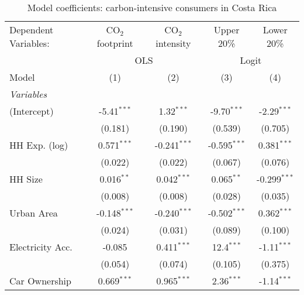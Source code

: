 
\begin{table}[htbp!]
   \centering
   \small
   \begin{adjustbox}{width = 1\textwidth, max height = 0.95\textheight, center}
      \begin{threeparttable}[b]
         \caption{\label{tab:Logit_1_CRI} Model coefficients: carbon-intensive consumers in Costa Rica}
         \begin{tabular}{lcccc}
            \tabularnewline \midrule \midrule
            Dependent Variables: & CO$_{2}$ footprint & CO$_{2}$ intensity & Upper 20\%     & Lower 20\%\\   
             & \multicolumn{2}{c}{OLS} & \multicolumn{2}{c}{Logit} \\ 
            Model                & (1)                & (2)                & (3)            & (4)\\  
            \midrule
            \emph{Variables}\\
            (Intercept)          & -5.41$^{***}$      & 1.32$^{***}$       & -9.70$^{***}$  & -2.29$^{***}$\\   
                                 & (0.181)            & (0.190)            & (0.539)        & (0.705)\\   
            HH Exp. (log)        & 0.571$^{***}$      & -0.241$^{***}$     & -0.595$^{***}$ & 0.381$^{***}$\\   
                                 & (0.022)            & (0.022)            & (0.067)        & (0.076)\\   
            HH Size              & 0.016$^{**}$       & 0.042$^{***}$      & 0.065$^{**}$   & -0.299$^{***}$\\   
                                 & (0.008)            & (0.008)            & (0.028)        & (0.035)\\   
            Urban Area           & -0.148$^{***}$     & -0.240$^{***}$     & -0.502$^{***}$ & 0.362$^{***}$\\   
                                 & (0.024)            & (0.031)            & (0.089)        & (0.100)\\   
            Electricity Acc.     & -0.085             & 0.411$^{***}$      & 12.4$^{***}$   & -1.11$^{***}$\\   
                                 & (0.054)            & (0.074)            & (0.105)        & (0.375)\\   
            Car Ownership        & 0.669$^{***}$      & 0.965$^{***}$      & 2.36$^{***}$   & -1.14$^{***}$\\   

\end{tabular}
\end{threeparttable}
\end{adjustbox}
\end{table}
